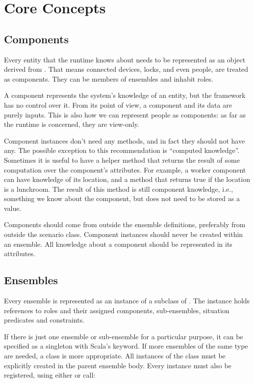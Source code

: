 \section{Core Concepts}
\label{dsl:concepts}


\subsection{Components}
\label{dsl:c:components}

Every entity that the runtime knows about needs to be represented as an object derived
from . That means connected devices, locks, and even people, are treated
as components. They can be members of ensembles and inhabit roles.

A component represents the system's knowledge of an entity, but the framework has no
control over it. From its point of view, a component and its data are purely inputs.
This is also how we can represent people as components: as far as the runtime is
concerned, they are view-only.

Component instances don't need any methods, and in fact they should not have any. The
possible exception to this recommendation is ``computed knowledge''. Sometimes it is
useful to have a helper method that returns the result of some computation over the
component's attributes. For example, a worker component can have knowledge of its
location, and a method  that returns true if the location is a
lunchroom. The result of this method is still component knowledge, i.e., something we
know about the component, but does not need to be stored as a value.

Components should come from outside the ensemble definitions, preferably from outside
the scenario class. Component instances should never be created within an ensemble. All
knowledge about a component should be represented in its attributes.


\subsection{Ensembles}
\label{dsl:c:ensembles}

Every ensemble is represented as an instance of a subclass of . The
instance holds references to roles and their assigned components, sub-ensembles,
situation predicates and constraints.

If there is just one ensemble or sub-ensemble for a particular purpose, it can be
specified as a singleton with Scala's  keyword. If more ensembles of the same
type are needed, a class is more appropriate. All instances of the class must be
explicitly created in the parent ensemble body. Every instance must also be registered,
using either  or  call:

